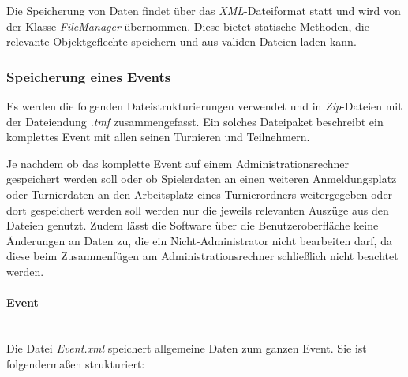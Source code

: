 \documentclass[11pt]{article}
\newcommand{\subsubsubsection}[1]{\paragraph{#1}\mbox{}\\}
\begin{document}
Die Speicherung von Daten findet über das \textit{XML}-Dateiformat statt und wird von der Klasse \textit{FileManager} übernommen. Diese bietet statische Methoden, die relevante Objektgeflechte speichern und aus validen Dateien laden kann.

\subsubsection{Speicherung eines Events}

Es werden die folgenden Dateistrukturierungen verwendet und in \textit{Zip}-Dateien mit der Dateiendung \textit{.tmf} zusammengefasst. Ein solches Dateipaket beschreibt ein komplettes Event mit allen seinen Turnieren und Teilnehmern.

Je nachdem ob das komplette Event auf einem Administrationsrechner gespeichert werden soll oder ob Spielerdaten an einen weiteren Anmeldungsplatz oder Turnierdaten an den Arbeitsplatz eines Turnierordners weitergegeben oder dort gespeichert werden soll werden nur die jeweils relevanten Auszüge aus den Dateien genutzt. Zudem lässt die Software über die Benutzeroberfläche keine Änderungen an Daten zu, die ein Nicht-Administrator nicht bearbeiten darf, da diese beim Zusammenfügen am Administrationsrechner schließlich nicht beachtet werden.

\newpage

\subsubsubsection{Event}

Die Datei \textit{Event.xml} speichert allgemeine Daten zum ganzen Event. Sie ist folgendermaßen strukturiert:
\vspace{0.4cm}
\end{document}
